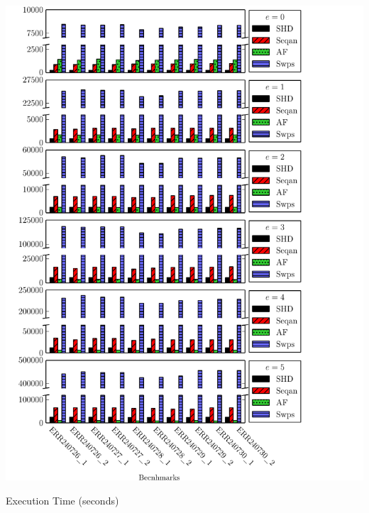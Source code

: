 \documentclass[12pt]{standalone}
\begin{document}
\large
\pagestyle{empty}
\begin{minipage}{26.2cm}
\noindent
\includegraphics[angle=-90]{combine_fig.pdf}\break
\vspace{-18.5cm}
\begin{center} \small Execution Time (seconds) \end{center}
\vspace{17cm}
\end{minipage}
\end{document}
